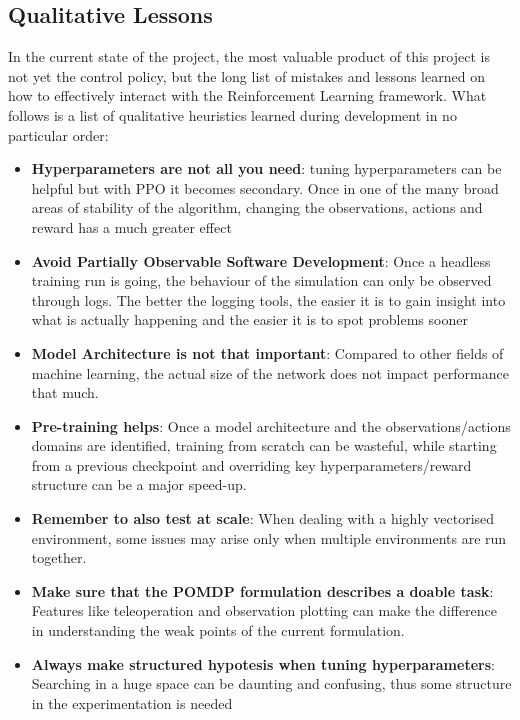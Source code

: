 \documentclass[11pt,a4paper,twocolumn]{article}
\begin{document}
\subsection{Qualitative Lessons}
In the current state of the project, the most valuable product of this project is not yet the control policy, but the long list of mistakes and lessons learned on how to effectively interact with the Reinforcement Learning framework. What follows is a list of qualitative heuristics learned during development in no particular order:
\begin{itemize}
    \item \textbf{Hyperparameters are not all you need}: tuning hyperparameters can be helpful but with PPO it becomes secondary. Once in one of the many broad areas of stability of the algorithm, changing the observations, actions and reward has a much greater effect
    \item \textbf{Avoid Partially Observable Software Development}: Once a headless training run is going, the behaviour of the simulation can only be observed through logs. The better the logging tools, the easier it is to gain insight into what is actually happening and the easier it is to spot problems sooner
    \item \textbf{Model Architecture is not that important}: Compared to other fields of machine learning, the actual size of the network does not impact performance that much.
    \item \textbf{Pre-training helps}: Once a model architecture and the observations/actions domains are identified, training from scratch can be wasteful, while starting from a previous checkpoint and overriding key hyperparameters/reward structure can be a major speed-up.
    \item \textbf{Remember to also test at scale}: When dealing with a highly vectorised environment, some issues may arise only when multiple environments are run together.
    \item \textbf{Make sure that the POMDP formulation describes a doable task}: Features like teleoperation and observation plotting can make the difference in understanding the weak points of the current formulation.
    \item \textbf{Always make structured hypotesis when tuning hyperparameters}: Searching in a huge space can be daunting and confusing, thus some structure in the experimentation is needed 

    
\end{itemize}
\end{document}
